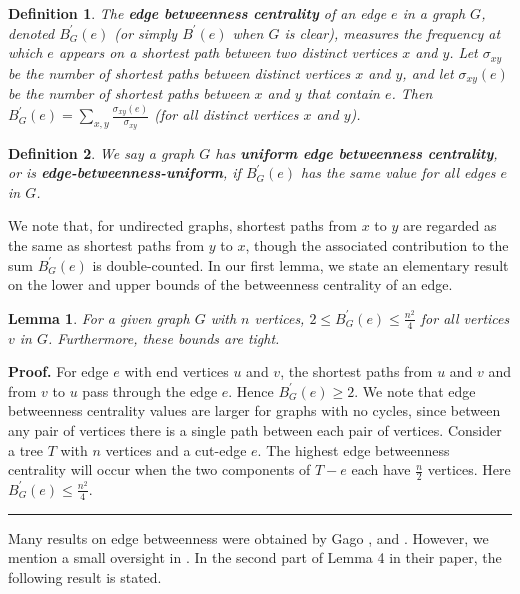 \documentclass{article}%
\newtheorem{definition}{Definition}[section]
\newtheorem{lemma}{Lemma}[section]
\newenvironment{proof}[1][Proof]{\textbf{#1.} }{\ \rule{0.5em}{0.5em}}
\begin{document}
\begin{definition}
The \textbf{edge betweenness centrality} of an edge $e$ in a graph $G$,
denoted $B_{G}^{\prime}(e)$ (or simply $B^{\prime}(e)$ when $G$ is clear),
measures the frequency at which $e$ appears on a shortest path between two
distinct vertices $x$ and $y$. Let $\sigma_{xy}$ be the number of shortest
paths between distinct vertices $x$ and $y$, and let $\sigma_{xy}(e)$ be the
number of shortest paths between $x$ and $y$ that contain $e$. Then
$B_{G}^{\prime}(e)={\displaystyle\sum\limits_{x,y}}\frac{\sigma_{xy}%
(e)}{\sigma_{xy}}$ (for all distinct vertices $x$ and $y$).
\end{definition}

\begin{definition}
We say a graph $G$ has \textbf{uniform edge betweenness centrality}, or is
\textbf{edge-betweenness-uniform}, if $B_{G}^{\prime}(e)$ has the same value
for all edges $e$ in $G$.
\end{definition}

We note that, for undirected graphs, shortest paths from $x$ to $y$ are
regarded as the same as shortest paths from $y$ to $x$, though the associated
contribution to the sum $B_{G}^{\prime}(e)$ is double-counted. In our first
lemma, we state an elementary result on the lower and upper bounds of the
betweenness centrality of an edge.

\begin{lemma}
For a given graph $G$ with $n$ vertices, $2\leq B_{G}^{\prime}(e)\leq
\frac{n^{2}}{4}$ for all vertices $v$ in $G$. Furthermore, these bounds are tight.
\end{lemma}

\begin{proof}
For edge $e$ with end vertices $u$ and $v$, the shortest paths from $u$ and
$v$ and from $v$ to $u$ pass through the edge $e$. Hence $B_{G}^{\prime
}(e)\geq2$. We note that edge betweenness centrality values are larger for
graphs with no cycles, since between any pair of vertices there is a single
path between each pair of vertices. Consider a tree $T$ with $n$ vertices and
a cut-edge $e$. The highest edge betweenness centrality will occur when the
two components of $T-e$ each have $\frac{n}{2}$ vertices. Here $B_{G}^{\prime
}(e)\leq\frac{n^{2}}{4}$.
\end{proof}

Many results on edge betweenness were obtained by Gago \cite{GagoS,GagoUB},
and \cite{Gago}. However, we mention a small oversight in \cite{GagoS}. In the
second part of Lemma 4 in their paper, the following result is stated.
\end{document}

